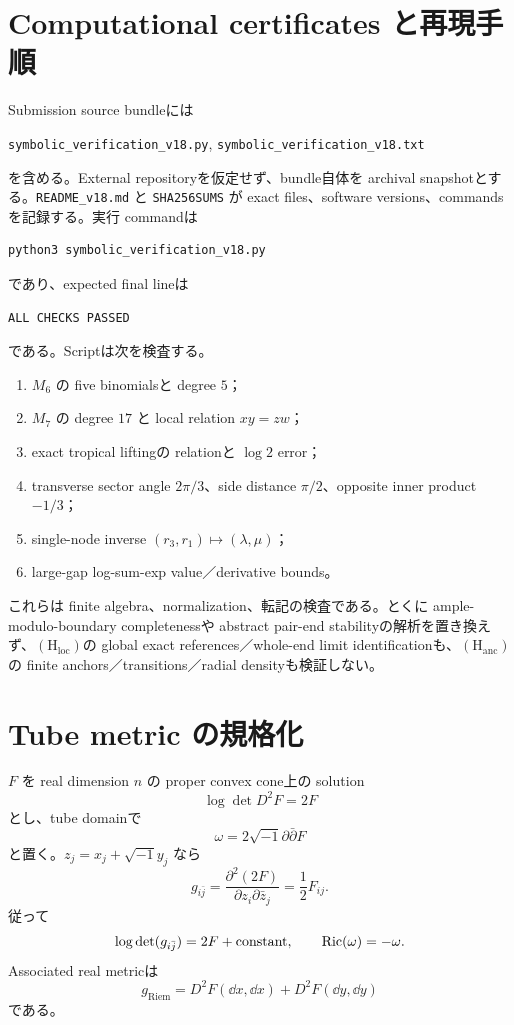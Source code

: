 \documentclass[11pt,a4paper]{ltjsarticle}
\newcommand{\Hloc}{\ensuremath{(\mathrm H_{\mathrm{loc}})}}
\newcommand{\Hanc}{\ensuremath{(\mathrm H_{\mathrm{anc}})}}
\theoremstyle{plain}
\theoremstyle{definition}
\theoremstyle{remark}
\begin{document}
\section{Computational certificates と再現手順}\label{app:certificates}
Submission source bundleには
\begin{center}
\texttt{symbolic\_verification\_v18.py},\qquad
\texttt{symbolic\_verification\_v18.txt}
\end{center}
を含める。External repositoryを仮定せず、bundle自体を archival snapshotとする。\texttt{README\_v18.md} と \texttt{SHA256SUMS} が exact files、software versions、commandsを記録する。実行 commandは
\begin{verbatim}
python3 symbolic_verification_v18.py
\end{verbatim}
であり、expected final lineは
\begin{verbatim}
ALL CHECKS PASSED
\end{verbatim}
である。Scriptは次を検査する。
\begin{enumerate}
 \item $M_6$ の five binomialsと degree $5$；
 \item $M_7$ の degree $17$ と local relation $xy=zw$；
 \item exact tropical liftingの relationと $\log2$ error；
 \item transverse sector angle $2\pi/3$、side distance $\pi/2$、opposite inner product $-1/3$；
 \item single-node inverse $(r_3,r_1)\mapsto(\lambda,\mu)$；
 \item large-gap log-sum-exp value／derivative bounds。
\end{enumerate}
これらは finite algebra、normalization、転記の検査である。とくに ample-modulo-boundary completenessや abstract pair-end stabilityの解析を置き換えず、\Hloc の global exact references／whole-end limit identificationも、\Hanc の finite anchors／transitions／radial densityも検証しない。

\section{Tube metric の規格化}\label{app:tube-normalization}
$F$ を real dimension $n$ の proper convex cone上の solution
\[
 \log\det D^2F=2F
\]
とし、tube domainで
\[
 \omega=2\sqrt{-1}\partial\bar\partial F
\]
と置く。$z_j=x_j+\sqrt{-1}y_j$ なら
\[
 g_{i\bar j}
 =\frac{\partial^2(2F)}{\partial z_i\partial\bar z_j}
 =\frac12F_{ij}.
\]
従って
\[
 \log\det(g_{i\bar j})=2F+\mathrm{constant},
 \qquad
 \operatorname{Ric}(\omega)=-\omega.
\]
Associated real metricは
\[
 g_{\mathrm{Riem}}
 =D^2F(\dd x,\dd x)+D^2F(\dd y,\dd y)
\]
である。
\end{document}
